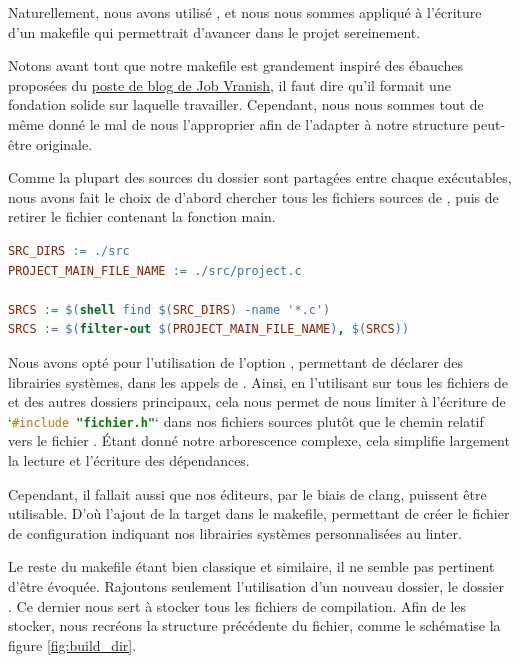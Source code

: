     Naturellement, nous avons utilisé , et nous nous sommes appliqué à l'écriture d'un makefile qui
permettrait d'avancer dans le projet sereinement.

    Notons avant tout que notre makefile est grandement inspiré des ébauches proposées du \href{https://spin.atomicobject.com/makefile-c-projects/}{poste de blog de Job Vranish}, 
il faut dire qu'il formait une fondation solide sur laquelle travailler. Cependant, nous nous sommes tout de même donné le mal de nous l'approprier
afin de l'adapter à notre structure peut-être originale.

    Comme la plupart des sources du dossier  sont partagées entre chaque exécutables, nous avons fait le choix de
d'abord chercher tous les fichiers sources de , puis de retirer le fichier  contenant la fonction main.

\begin{lstlisting}[frame=single, language=make, caption={Filtrage des fichiers sources du jeu}]
SRC_DIRS := ./src
PROJECT_MAIN_FILE_NAME := ./src/project.c

SRCS := $(shell find $(SRC_DIRS) -name '*.c')
SRCS := $(filter-out $(PROJECT_MAIN_FILE_NAME), $(SRCS))
\end{lstlisting}

    Nous avons opté pour l'utilisation de l'option , permettant de déclarer des librairies systèmes, dans les appels de . Ainsi, en 
l'utilisant sur tous les fichiers de  et des autres dossiers principaux, cela nous permet de nous limiter à l'écriture de `\lstinline[language=C]{#include "fichier.h"}` dans nos fichiers sources plutôt que le chemin relatif vers le fichier . Étant donné notre arborescence complexe, cela simplifie largement la lecture et l'écriture des dépendances.

    Cependant, il fallait aussi que nos éditeurs, par le biais de clang, puissent être utilisable. D'où l'ajout de la target  dans
le makefile, permettant de créer le fichier de configuration  indiquant nos librairies systèmes personnalisées au linter.

    Le reste du makefile étant bien classique et similaire, il ne semble pas pertinent d'être évoquée. Rajoutons
seulement l'utilisation d'un nouveau dossier, le dossier . Ce dernier nous sert à stocker tous les fichiers de compilation. Afin de les stocker, nous recréons la structure précédente du fichier, comme
le schématise la figure \ref{fig:build_dir}. 

